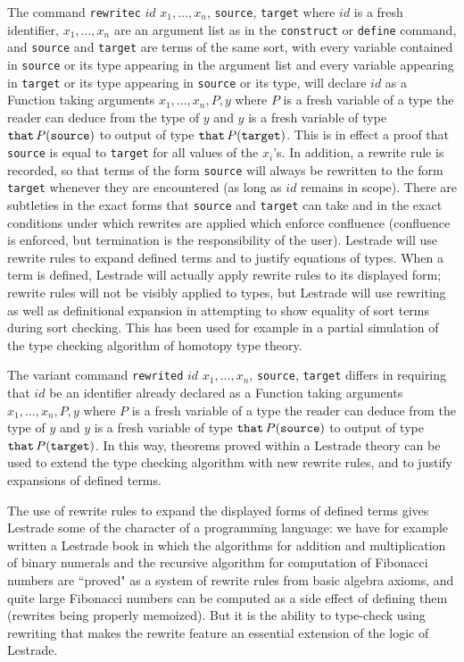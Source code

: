 \documentclass{article}
\begin{document}
The command {\tt rewritec} $id$ $x_1, \ldots, x_n$, {\tt source}, {\tt target}  where $id$ is a fresh identifier, $x_1, \ldots, x_n$ are an argument list as in the {\tt construct} or {\tt define} command, and {\tt source} and {\tt target} are terms of the same sort, with every variable contained in {\tt source} or its type appearing in the argument list and every variable appearing in {\tt target} or its type appearing in {\tt source} or its type, will declare $id$ as a Function taking arguments $x_1,\ldots,x_n,P,y$ where $P$ is a fresh variable of a type the reader can deduce from the type of $y$ and $y$ is a fresh variable of type
${\tt that} \,P({\tt source})$ to output of type ${\tt that}\, P({\tt target})$.  This is in effect a proof that {\tt source} is equal to {\tt target} for all values of the $x_i$'s.  In addition, a rewrite rule is recorded, so that terms of the form {\tt source} will always be rewritten to the form {\tt target} whenever they are encountered (as long as $id$ remains in scope).  There are subtleties in the exact forms that {\tt source} and {\tt target} can take and in the exact conditions under which rewrites are applied which enforce confluence (confluence is enforced, but termination is the responsibility of the user).  Lestrade will use rewrite rules to expand defined terms and to justify equations of types.   When a term is defined, Lestrade will actually apply rewrite rules to its displayed form;  rewrite rules will not be visibly applied to types, but Lestrade will use rewriting as well as definitional expansion in attempting to show equality of sort terms during sort checking.   This has been used for example in a partial simulation of the type checking algorithm of homotopy type theory. 

The variant command  {\tt rewrited} $id$ $x_1, \ldots, x_n$, {\tt source}, {\tt target} differs in requiring that $id$ be an identifier already declared as a Function taking arguments $x_1,\ldots,x_n,P,y$ where $P$ is a fresh variable of a type the reader can deduce from the type of $y$ and $y$ is a fresh variable of type
${\tt that} \,P({\tt source})$ to output of type ${\tt that}\, P({\tt target})$.  In this way, theorems proved within a Lestrade theory can be used to extend the type checking algorithm with new rewrite rules, and to justify expansions of defined terms.

The use of rewrite rules to expand the displayed forms of defined terms gives Lestrade some of the character of a programming language:  we have for example written a Lestrade book in which the algorithms for addition and multiplication of binary numerals and the recursive algorithm for computation of Fibonacci numbers are ``proved" as a system of rewrite rules from basic algebra axioms, and quite large Fibonacci numbers can be computed as a side effect of defining them (rewrites being properly memoized).  But it is the ability to type-check using rewriting that makes the rewrite feature an essential extension of the logic of Lestrade.
\end{document}

